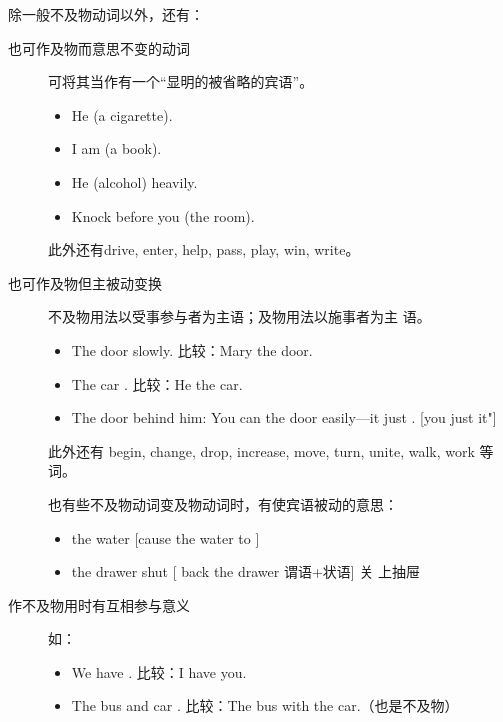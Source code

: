 除一般不及物动词以外，还有：
\begin{description}
\item[也可作及物而意思不变的动词] 可将其当作有一个“显明的被省略的宾语”。
  \begin{itemize}
  \item He  (a cigarette).

  \item I am  (a book).

  \item He  (alcohol) heavily.

  \item Knock before you  (the room).
  \end{itemize}此外还有drive, enter, help, pass, play, win, write。

\item[也可作及物但主被动变换] 不及物用法以受事参与者为主语；及物用法以施事者为主
语。
  \begin{itemize}
  \item The door  slowly. 比较：Mary  the door.

  \item The car . 比较：He  the car.

  \item The door  behind him: You can  the door
easily---it just . [you just  it"]
  \end{itemize}此外还有 begin, change, drop, increase, move, turn, unite, walk,
work 等词。

  也有些不及物动词变及物动词时，有使宾语被动的意思：
  \begin{itemize}
  \item {} the water [cause the water to ]

  \item {} the drawer shut [ back the drawer 谓语+状语] 关
上抽屉
  \end{itemize}

\item[作不及物用时有互相参与意义] 如：
  \begin{itemize}
  \item We have . 比较：I have  you.

  \item The bus and car . 比较：The bus  with the
car.（也是不及物）
  \end{itemize}
\end{description}

